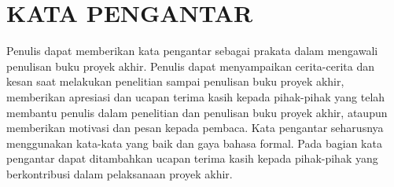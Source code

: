 \cleardoublepage
\chapter*{KATA PENGANTAR}
\thispagestyle{fancy}

Penulis dapat memberikan kata pengantar sebagai prakata dalam mengawali penulisan buku
proyek akhir. Penulis dapat menyampaikan cerita-cerita dan kesan saat melakukan
penelitian sampai penulisan buku proyek akhir, memberikan apresiasi dan ucapan terima
kasih kepada pihak-pihak yang telah membantu penulis dalam penelitian dan penulisan buku
proyek akhir, ataupun memberikan motivasi dan pesan kepada pembaca. Kata pengantar
seharusnya menggunakan kata-kata yang baik dan gaya bahasa formal. Pada bagian kata
pengantar dapat ditambahkan ucapan terima kasih kepada pihak-pihak yang berkontribusi
dalam pelaksanaan proyek akhir.